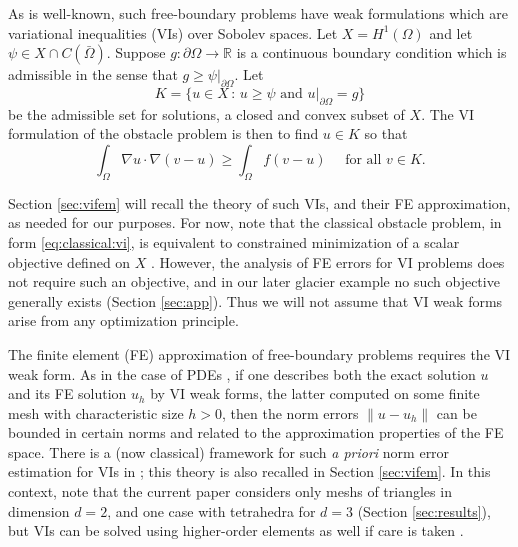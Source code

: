 \documentclass[]{interact}
\theoremstyle{plain}%
\theoremstyle{definition}
\theoremstyle{remark}
\newcommand{\RR}{\mathbb{R}}
\begin{document}
As is well-known, such free-boundary problems have weak formulations which are variational inequalities (VIs) over Sobolev spaces.  Let $X=H^1(\Omega)$ \cite{ElmanSilvesterWathen2014} and let $\psi \in X \cap C(\bar\Omega)$.  Suppose $g:\partial \Omega\to \RR$ is a continuous boundary condition which is admissible in the sense that $g \ge \psi|_{\partial \Omega}$.  Let
\begin{equation} \label{eq:classical:admissible}
K = \{u \in X \,:\, u \ge \psi \text{ and } u|_{\partial \Omega} = g\}
\end{equation}
be the admissible set for solutions, a closed and convex subset of $X$.  The VI formulation of the obstacle problem is then to find $u\in K$ so that
\begin{equation} \label{eq:classical:vi}
\int_\Omega \nabla u \cdot \nabla(v - u) \ge \int_\Omega f(v - u) \quad \text{ for all } v \in K.
\end{equation}

Section \ref{sec:vifem} will recall the theory of such VIs, and their FE approximation, as needed for our purposes.  For now, note that the classical obstacle problem, in form \eqref{eq:classical:vi}, is equivalent to constrained minimization of a scalar objective defined on $X$ \cite{KinderlehrerStampacchia1980}.  However, the analysis of FE errors for VI problems does not require such an objective, and in our later glacier example no such objective generally exists (Section \ref{sec:app}).  Thus we will not assume that VI weak forms arise from any optimization principle.

The finite element (FE) approximation of free-boundary problems requires the VI weak form.  As in the case of PDEs \cite{ElmanSilvesterWathen2014}, if one describes both the exact solution $u$ and its FE solution $u_h$ by VI weak forms, the latter computed on some finite mesh with characteristic size $h>0$, then the norm errors $\|u-u_h\|$ can be bounded in certain norms and related to the approximation properties of the FE space.  There is a (now classical) framework for such \emph{a priori} norm error estimation for VIs in \cite{Falk1974}; this theory is also recalled in Section \ref{sec:vifem}.  In this context, note that the current paper considers only meshs of triangles in dimension $d=2$, and one case with tetrahedra for $d=3$ (Section \ref{sec:results}), but VIs can be solved using higher-order elements as well if care is taken \cite{KeithSurowiec2024}.
\end{document}
